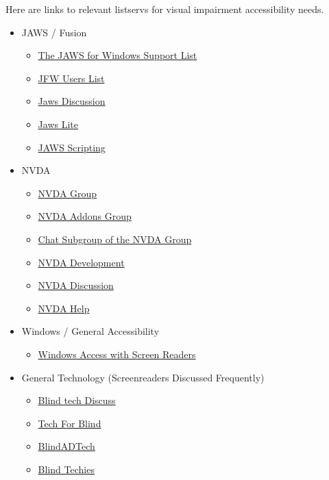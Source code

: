 Here are links to relevant listservs for visual impairment accessibility needs.
\begin{itemize}
 \item JAWS / Fusion
 \begin{itemize}
 \item \href{http://www.groups.io/g/jfw/}{The JAWS for Windows Support List}
 \item \href{http://groups.io/g/jfw-users/}{JFW Users List}
 \item \href{http://groups.io/g/jawsdiscussion/}{Jaws Discussion}
 \item \href{http://groups.io/g/jawslite/}{Jaws Lite}
 \item \href{http://groups.io/g/jawsscripting/}{JAWS Scripting}
 \end{itemize}
 \item NVDA
 \begin{itemize}
 \item \href{http://nvda.groups.io/g/nvda/ }{NVDA Group}
 \item \href{http://nvda-addons.groups.io/g/nvda-addons}{NVDA Addons Group}
 \item \href{http://nvda.groups.io/g/chat/ }{Chat Subgroup of the NVDA Group}
 \item \href{http://groups.io/g/nvda-devel/messages}{NVDA Development}
 \item \href{http://groups.io/g/nvdadiscussion/messages}{NVDA Discussion}
 \item \href{http://groups.io/g/NVDAhelp/messages}{NVDA Help}
 \end{itemize}
 \item Windows / General Accessibility
 \begin{itemize}
 \item \href{http://winaccess.groups.io/g/winaccess}{Windows Access with Screen Readers}
 \end{itemize}
 \item General Technology (Screenreaders Discussed Frequently)
 \begin{itemize}
 \item \href{http://groups.io/g/blindtechdiscuss/messages}{Blind tech Discuss}
 \item \href{http://groups.io/g/tech-for-blind}{Tech For Blind}
 \item \href{http://groups.io/g/blindadtech}{BlindADTech}
 \item \href{http://groups.io/g/blind-techies/messages}{Blind Techies}
 \end{itemize}
\end{itemize}
